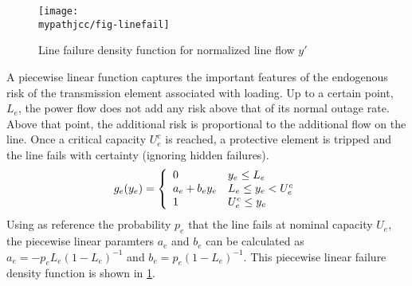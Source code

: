 \begin{figure}
 \centering                    
   \texttt{[image: \\mypathjcc/fig-linefail]}   
   \caption{Line failure density function for normalized line flow $y'$} \label{fig:linefaildensity}
\end{figure}


A piecewise linear function captures the important features of the endogenous risk of the transmission element associated with loading.  Up to a certain point, $L_e$, the power flow does not add any risk above that of its normal outage rate.  Above that point, the additional risk is proportional to the additional flow on the line.  Once a critical capacity $U_e^c$ is reached, a protective element is tripped and the line fails with certainty (ignoring hidden failures).  
\begin{equation}\label{pwl_risk}
g_e(y_e) = \left\{ \begin{array}{l l}
  0 & y_e \leq L_e \\
  a_e + b_e y_e & L_e \leq y_e < U_e^c \\
  1 & U_e^c \leq y_e 
\end{array}
\right.
\end{equation}
Using as reference the probability $p_e$ that the line fails at nominal capacity $U_e$, the piecewise linear paramters $a_e$ and $b_e$ can be calculated as $a_e = -p_eL_e (1-L_e)^{-1}$ and  $b_e = p_e(1-L_e)^{-1}$.  This piecewise linear failure density function is shown in \cref{fig:linefaildensity}.








